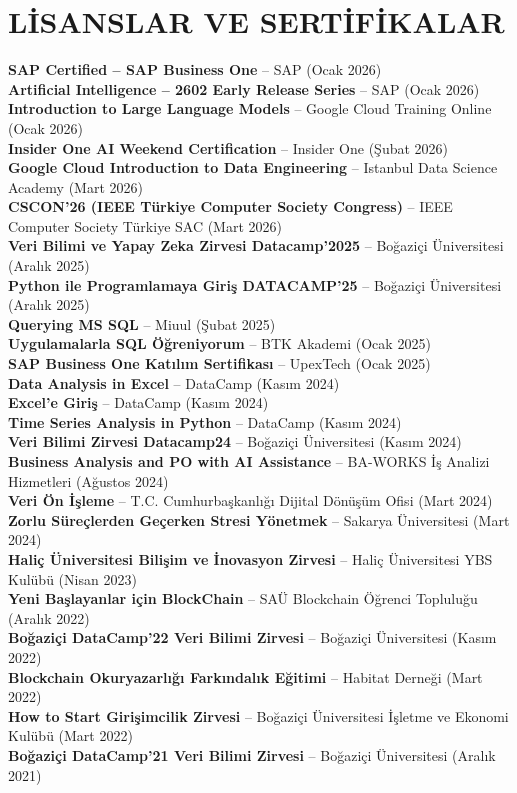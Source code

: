 \documentclass[a4paper,8pt]{article}
\begin{document}
\section{LİSANSLAR VE SERTİFİKALAR}
{\small
\textbf{SAP Certified -- SAP Business One} -- SAP (Ocak 2026)\\
\textbf{Artificial Intelligence -- 2602 Early Release Series} -- SAP (Ocak 2026)\\
\textbf{Introduction to Large Language Models} -- Google Cloud Training Online (Ocak 2026)\\
\textbf{Insider One AI Weekend Certification} -- Insider One (Şubat 2026)\\
\textbf{Google Cloud Introduction to Data Engineering} -- Istanbul Data Science Academy (Mart 2026)\\
\textbf{CSCON'26 (IEEE Türkiye Computer Society Congress)} -- IEEE Computer Society Türkiye SAC (Mart 2026)\\
\textbf{Veri Bilimi ve Yapay Zeka Zirvesi Datacamp'2025} -- Boğaziçi Üniversitesi (Aralık 2025)\\
\textbf{Python ile Programlamaya Giriş DATACAMP'25} -- Boğaziçi Üniversitesi (Aralık 2025)\\
\textbf{Querying MS SQL} -- Miuul (Şubat 2025)\\
\textbf{Uygulamalarla SQL Öğreniyorum} -- BTK Akademi (Ocak 2025)\\
\textbf{SAP Business One Katılım Sertifikası} -- UpexTech (Ocak 2025)\\
\textbf{Data Analysis in Excel} -- DataCamp (Kasım 2024)\\
\textbf{Excel'e Giriş} -- DataCamp (Kasım 2024)\\
\textbf{Time Series Analysis in Python} -- DataCamp (Kasım 2024)\\
\textbf{Veri Bilimi Zirvesi Datacamp24} -- Boğaziçi Üniversitesi (Kasım 2024)\\
\textbf{Business Analysis and PO with AI Assistance} -- BA-WORKS İş Analizi Hizmetleri (Ağustos 2024)\\
\textbf{Veri Ön İşleme} -- T.C. Cumhurbaşkanlığı Dijital Dönüşüm Ofisi (Mart 2024)\\
\textbf{Zorlu Süreçlerden Geçerken Stresi Yönetmek} -- Sakarya Üniversitesi (Mart 2024)\\
\textbf{Haliç Üniversitesi Bilişim ve İnovasyon Zirvesi} -- Haliç Üniversitesi YBS Kulübü (Nisan 2023)\\
\textbf{Yeni Başlayanlar için BlockChain} -- SAÜ Blockchain Öğrenci Topluluğu (Aralık 2022)\\
\textbf{Boğaziçi DataCamp'22 Veri Bilimi Zirvesi} -- Boğaziçi Üniversitesi (Kasım 2022)\\
\textbf{Blockchain Okuryazarlığı Farkındalık Eğitimi} -- Habitat Derneği (Mart 2022)\\
\textbf{How to Start Girişimcilik Zirvesi} -- Boğaziçi Üniversitesi İşletme ve Ekonomi Kulübü (Mart 2022)\\
\textbf{Boğaziçi DataCamp'21 Veri Bilimi Zirvesi} -- Boğaziçi Üniversitesi (Aralık 2021)
}
\end{document}
